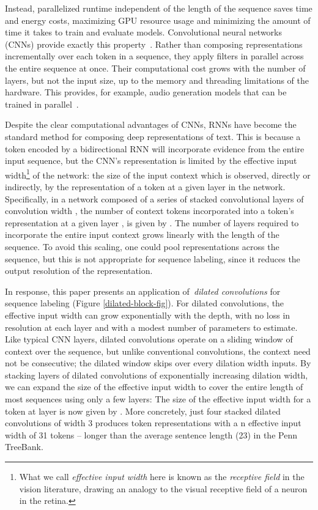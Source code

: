 \documentclass[11pt,letterpaper]{article}
\begin{document}
Instead, parallelized runtime independent of the length of the sequence saves time and energy costs, maximizing GPU resource usage and minimizing the amount of time it takes to train and evaluate models. Convolutional neural networks (CNNs) provide exactly this property~\citep{kim2014convolutional,kalchbrenner2014convolutional}. Rather than composing representations incrementally over each token in a sequence, they apply filters in parallel across the entire sequence at once.  Their computational cost grows with the number of layers, but not the input size, up to the memory and threading limitations of the hardware. This provides, for example, audio generation models that can be trained in parallel~\citep{vandenoord2016wavenet}. 





Despite the clear computational advantages of CNNs, RNNs have become the standard method for composing deep representations of text. This is because a token encoded by a bidirectional RNN will incorporate evidence from the entire input sequence, but the CNN's representation is limited by the effective input width\footnote{What we call \emph{effective input width} here is known as the \emph{receptive field} in the vision literature, drawing an analogy to the visual receptive field of a neuron in the retina.} of the network: the size of the input context which is observed, directly or indirectly, by the representation of a token at a given layer in the network. Specifically, in a network composed of a series of stacked convolutional layers of convolution width , the number  of context tokens incorporated into a token's representation at a given layer , is given by . The number of layers required to incorporate the entire input context grows linearly with the length of the sequence. To avoid this scaling, one could pool representations across the sequence, but this is not appropriate for sequence labeling, since it reduces the output resolution of the representation.








In response, this paper presents an application of~\emph{dilated convolutions} \citep{yu2015multi} for sequence labeling (Figure \ref{dilated-block-fig}). For dilated convolutions, the effective input width can grow exponentially with the depth, with no loss in resolution at each layer and with a modest number of parameters to estimate. Like typical CNN layers, dilated convolutions operate on a sliding window of context over the sequence, but unlike conventional convolutions, the context need not be consecutive; the dilated window skips over every dilation width  inputs. By stacking layers of dilated convolutions of exponentially increasing dilation width, we can expand the size of the effective input width to cover the entire length of most sequences using only a few layers: The size of the effective input width for a token at layer  is now given by . More concretely, just four stacked dilated convolutions of width 3 produces token representations with a n effective input width of 31 tokens -- longer than the average sentence length (23) in the Penn TreeBank. 
\end{document}

